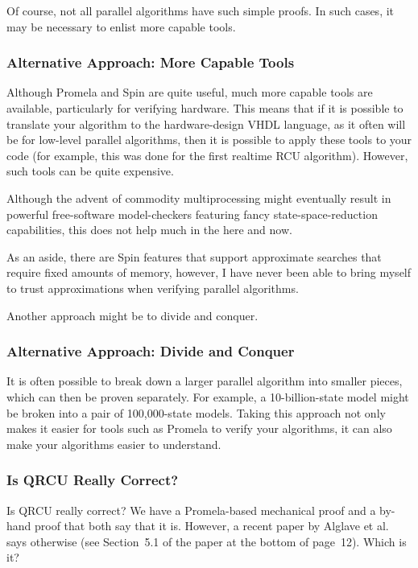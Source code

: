 Of course, not all parallel algorithms have such simple proofs.
In such cases, it may be necessary to enlist more capable tools.

\subsubsection{Alternative Approach: More Capable Tools}
\label{sec:formal:Alternative Approach: More Capable Tools}

Although Promela and Spin are quite useful,
much more capable tools are available, particularly for verifying
hardware.
This means that if it is possible to translate your algorithm
to the hardware-design VHDL language, as it often will be for
low-level parallel algorithms, then it is possible to apply these
tools to your code (for example, this was done for the first
realtime RCU algorithm).
However, such tools can be quite expensive.

Although the advent of commodity multiprocessing
might eventually result in powerful free-software model-checkers
featuring fancy state-space-reduction capabilities,
this does not help much in the here and now.

As an aside, there are Spin features that support approximate searches
that require fixed amounts of memory, however, I have never been able
to bring myself to trust approximations when verifying parallel
algorithms.

Another approach might be to divide and conquer.

\subsubsection{Alternative Approach: Divide and Conquer}
\label{sec:formal:Alternative Approach: Divide and Conquer}

It is often possible to break down a larger parallel algorithm into
smaller pieces, which can then be proven separately.
For example, a 10-billion-state model might be broken into a pair
of 100,000-state models.
Taking this approach not only makes it easier for tools such as
Promela to verify your algorithms, it can also make your algorithms
easier to understand.

\subsubsection{Is QRCU Really Correct?}
\label{sec:formal:Is QRCU Really Correct?}

Is QRCU really correct?
We have a Promela-based mechanical proof and a by-hand proof that both
say that it is.
However, a recent paper by Alglave et al.~\cite{JadeAlglave2013-cav}
says otherwise (see Section~5.1 of the paper at the bottom of page~12).
Which is it?

